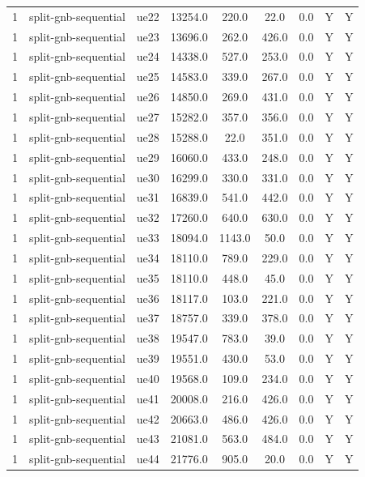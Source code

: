 \begin{table}[ht]
\begin{tabular}{|c|c|c|c|c|c|c|c|c|}
1 & split-gnb-sequential & ue22 & 13254.0 & 220.0 & 22.0 & 0.0 & Y & Y \\
1 & split-gnb-sequential & ue23 & 13696.0 & 262.0 & 426.0 & 0.0 & Y & Y \\
1 & split-gnb-sequential & ue24 & 14338.0 & 527.0 & 253.0 & 0.0 & Y & Y \\
1 & split-gnb-sequential & ue25 & 14583.0 & 339.0 & 267.0 & 0.0 & Y & Y \\
1 & split-gnb-sequential & ue26 & 14850.0 & 269.0 & 431.0 & 0.0 & Y & Y \\
1 & split-gnb-sequential & ue27 & 15282.0 & 357.0 & 356.0 & 0.0 & Y & Y \\
1 & split-gnb-sequential & ue28 & 15288.0 & 22.0 & 351.0 & 0.0 & Y & Y \\
1 & split-gnb-sequential & ue29 & 16060.0 & 433.0 & 248.0 & 0.0 & Y & Y \\
1 & split-gnb-sequential & ue30 & 16299.0 & 330.0 & 331.0 & 0.0 & Y & Y \\
1 & split-gnb-sequential & ue31 & 16839.0 & 541.0 & 442.0 & 0.0 & Y & Y \\
1 & split-gnb-sequential & ue32 & 17260.0 & 640.0 & 630.0 & 0.0 & Y & Y \\
1 & split-gnb-sequential & ue33 & 18094.0 & 1143.0 & 50.0 & 0.0 & Y & Y \\
1 & split-gnb-sequential & ue34 & 18110.0 & 789.0 & 229.0 & 0.0 & Y & Y \\
1 & split-gnb-sequential & ue35 & 18110.0 & 448.0 & 45.0 & 0.0 & Y & Y \\
1 & split-gnb-sequential & ue36 & 18117.0 & 103.0 & 221.0 & 0.0 & Y & Y \\
1 & split-gnb-sequential & ue37 & 18757.0 & 339.0 & 378.0 & 0.0 & Y & Y \\
1 & split-gnb-sequential & ue38 & 19547.0 & 783.0 & 39.0 & 0.0 & Y & Y \\
1 & split-gnb-sequential & ue39 & 19551.0 & 430.0 & 53.0 & 0.0 & Y & Y \\
1 & split-gnb-sequential & ue40 & 19568.0 & 109.0 & 234.0 & 0.0 & Y & Y \\
1 & split-gnb-sequential & ue41 & 20008.0 & 216.0 & 426.0 & 0.0 & Y & Y \\
1 & split-gnb-sequential & ue42 & 20663.0 & 486.0 & 426.0 & 0.0 & Y & Y \\
1 & split-gnb-sequential & ue43 & 21081.0 & 563.0 & 484.0 & 0.0 & Y & Y \\
1 & split-gnb-sequential & ue44 & 21776.0 & 905.0 & 20.0 & 0.0 & Y & Y \\

\end{tabular}
\end{table}
